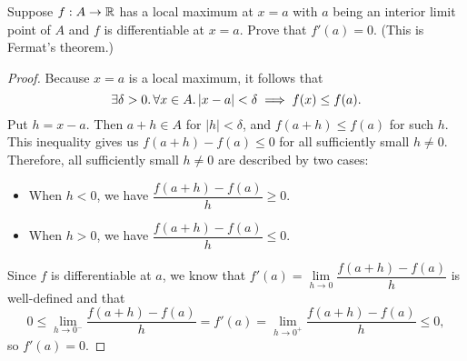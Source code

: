 \begin{problem}
  Suppose $f: A \to \mathbb{R}$ has a local maximum at $x = a$ with $a$ being an
  interior limit point of $A$ and $f$ is differentiable at $x = a$.
  Prove that $f'(a) = 0$. (This is Fermat's theorem.)

  \begin{proof}
    Because $x = a$ is a local maximum, it follows that
    \[
      \exists \delta > 0.\, \forall x \in A. \left\lvert x - a \right\rvert < \delta \implies f(x) \leq f(a).
    \] 
    Put $h = x - a$. Then $a + h \in A$ for $|h| < \delta$, and $f(a + h) \leq f(a)$ for such $h$.
    This inequality gives us $f(a + h) - f(a) \leq 0$ for all sufficiently small $h \neq 0$.
    Therefore, all sufficiently small $h \neq 0$ are described by two cases:
    \begin{itemize}
      \item When $h < 0$, we have $\dfrac{f(a + h) - f(a)}{h} \geq 0$.
      \item When $h > 0$, we have $\dfrac{f(a + h) - f(a)}{h} \leq 0$.
    \end{itemize}

    Since $f$ is differentiable at $a$, we know that 
    $f'(a) = \lim\limits_{h \to 0} \dfrac{f(a + h) - f(a)}{h}$ is well-defined and that
    \[
      0 \leq \lim\limits_{h \to 0^{-}} \dfrac{f(a + h) - f(a)}{h} = f'(a) = \lim_{h \to 0^{+}} \frac{f(a + h) - f(a)}{h} \leq 0,
    \]
    so $f'(a) = 0$.
  \end{proof}

\end{problem}
